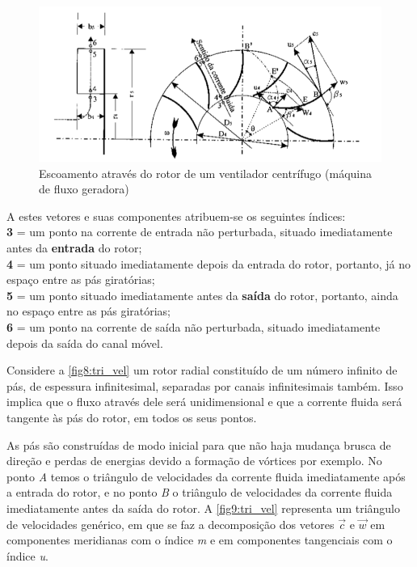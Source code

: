     \begin{figure}[htb]
        \centering
        \caption {\label{fig8:tri_vel} Escoamento através do rotor de um ventilador centrífugo (máquina de fluxo geradora)}
        \includegraphics[scale=0.65]{images/fig8.png}
    \end{figure}

    \noindent
        A estes vetores e suas componentes atribuem-se os seguintes índices: \\
        \textbf{3} = um ponto na corrente de entrada não perturbada, situado imediatamente antes da \textbf{entrada} do rotor; \\
        \textbf{4} = um ponto situado imediatamente depois da entrada do rotor, portanto, já no espaço entre as pás giratórias; \\
        \textbf{5} = um ponto situado imediatamente antes da \textbf{saída} do rotor, portanto, ainda no espaço entre as pás giratórias; \\
        \textbf{6} = um ponto  na corrente de saída não perturbada, situado imediatamente depois da saída do canal móvel.

        Considere a \autoref{fig8:tri_vel} um rotor radial constituído de um número infinito de pás, de espessura infinitesimal, separadas por canais infinitesimais também. Isso implica que o fluxo através dele será unidimensional e que a corrente fluida será tangente às pás do rotor, em todos os seus pontos.

        As pás são construídas de modo inicial para que não haja mudança brusca de direção e perdas de energias devido a formação de vórtices por exemplo. No ponto \textit{A} temos o triângulo de velocidades da corrente fluida imediatamente após a entrada do rotor, e no ponto \textit{B} o triângulo de velocidades da corrente fluida imediatamente antes da saída do rotor. A \autoref{fig9:tri_vel} representa um triângulo de velocidades genérico, em que se faz a decomposição dos vetores $\vec{c}$ e $\vec{w}$ em componentes meridianas com o índice \textit{m} e em componentes tangenciais com o índice \textit{u}.

